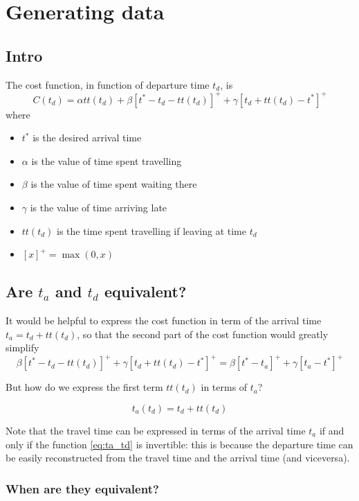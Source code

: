 \documentclass{article}
\begin{document}
\section{Generating data}

\subsection{Intro}

The cost function, in function of departure time \(t_d\), is
\begin{equation}
  \label{eq:cost_td}
  C(t_d) = \alpha tt(t_d) + \beta[t^*-t_d-tt(t_d)]^+ + \gamma[t_d+tt(t_d)-t^*]^+ 
\end{equation}
where
\begin{itemize}
\item \(t^*\) is the desired arrival time
\item \(\alpha\) is the value of time spent travelling
\item \(\beta\) is the value of time spent waiting there
\item \(\gamma\) is the value of time arriving late
\item \(tt(t_d)\) is the time spent travelling if leaving at time \(t_d\)
\item \([x]^+ = \max(0, x)\)
\end{itemize}

\subsection{Are $t_a$ and $t_d$ equivalent?}

It would be helpful to express the cost function in term of the arrival time \(t_a = t_d + tt(t_d)\),
so that the second part of the cost function would greatly simplify
\[ \beta[t^*-t_d-tt(t_d)]^+ + \gamma[t_d+tt(t_d)-t^*]^+ = \beta[t^*-t_a]^+ + \gamma[t_a-t^*]^+ \]

But how do we express the first term \(tt(t_d)\) in terms of \(t_a\)?

\begin{equation}
  \label{eq:ta_td}
  t_a(t_d) = t_d + tt(t_d)
\end{equation}

Note that the travel time can be expressed in terms of the arrival time \(t_a\) if and only if the function
\eqref{eq:ta_td} is invertible:
this is because the departure time can be easily reconstructed from the travel time and the arrival time (and viceversa).

\subsubsection{When are they equivalent?}
\end{document}
